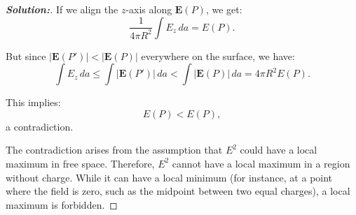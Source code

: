 \documentclass[12pt]{article}
\theoremstyle{definition}\newtheorem{problem}{Problem}
\newenvironment{solution}{\begin{proof}[\bfseries\textup{Solution:}]}{\end{proof}}
\begin{document}
\begin{solution}
    If we align the $z$-axis along $\mathbf{E}(P)$, we get:
    \[
    \frac{1}{4\pi R^2} \int E_z \, da = E(P).
    \]
    
    But since $|\mathbf{E}(P')| < |\mathbf{E}(P)|$ everywhere on the surface, we have:
    \[
    \int E_z \, da \leq \int |\mathbf{E}(P')|\, da < \int |\mathbf{E}(P)|\, da = 4\pi R^2 E(P).
    \]
    
    This implies:
    \[
    E(P) < E(P),
    \]
    a contradiction.
    
    The contradiction arises from the assumption that $E^2$ could have a local maximum in free space. Therefore, $E^2$ cannot have a local maximum in a region without charge. While it can have a local minimum (for instance, at a point where the field is zero, such as the midpoint between two equal charges), a local maximum is forbidden.
    

\end{solution}
\end{document}
